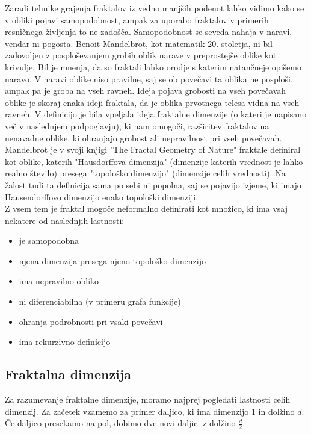 \documentclass[a4paper, 12px]{article}
\begin{document}
        \addvspace{0.5cm}
        Zaradi tehnike grajenja fraktalov iz vedno manjših podenot lahko vidimo kako se v obliki pojavi samopodobnost, ampak za uporabo fraktalov v primerih resničnega življenja to ne zadošča.
        Samopodobnost se seveda nahaja v naravi, vendar ni pogosta.
        Benoit Mandelbrot, kot matematik 20. stoletja, ni bil zadovoljen z posploševanjem grobih oblik narave v preprostejše oblike kot krivulje.
        Bil je mnenja, da so fraktali lahko orodje s katerim natančneje opišemo naravo.
        V naravi oblike niso pravilne, saj se ob povečavi ta oblika ne posploši, ampak pa je groba na vseh ravneh.
        Ideja pojava grobosti na vseh povečavah oblike je skoraj enaka ideji fraktala, da je oblika prvotnega telesa vidna na vseh ravneh.
        V definicijo je bila vpeljala ideja fraktalne dimenzije (o kateri je napisano več v naslednjem podpoglavju), ki nam omogoči, razširitev fraktalov na nenavadne oblike, ki ohranjajo grobost ali nepravilnost pri vseh povečavah.
        Mandelbrot je v svoji knjigi "The Fractal Geometry of Nature" fraktale definiral kot oblike, katerih "Hausdorffova dimenzija" (dimenzije katerih vrednost je lahko realno število) presega "topološko dimenzijo" (dimenzije celih vrednosti).
        Na žalost tudi ta definicija sama po sebi ni popolna, saj se pojavijo izjeme, ki imajo Hausendorffovo dimenzijo enako topološki dimenziji.
        \cite{FractalDefinitionVideo}
        \cite{HausdorffDimension}\\

        Z vsem tem je fraktal mogoče neformalno definirati kot množico, ki ima vsaj nekatere od naslednjih lastnosti:
        \cite{irvsic2015fraktalna}
        \begin{itemize}
            \item je samopodobna
            \item njena dimenzija presega njeno topološko dimenzijo
            \item ima nepravilno obliko
            \item ni diferenciabilna (v primeru grafa funkcije)
            \item ohranja podrobnosti pri vsaki povečavi
            \item ima rekurzivno definicijo
        \end{itemize}

    \subsection{Fraktalna dimenzija}
        Za razumevanje fraktalne dimenzije, moramo najprej pogledati lastnosti celih dimenzij.
        Za začetek vzamemo za primer daljico, ki ima dimenzijo 1 in dolžino $d$.
        Če daljico presekamo na pol, dobimo dve novi daljici z dolžino $\frac{d}{2}$.
        
\end{document}
